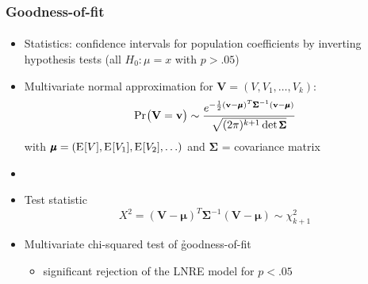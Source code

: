 \documentclass[handout,notes=show,t]{beamer} %
\begin{document}
\begin{frame}
  \frametitle{Goodness-of-fit}
  \framesubtitle{\citep[Sec.~3.3]{Baayen:01}}

  \begin{itemize}
  \item Statistics: confidence intervals for population coefficients by inverting hypothesis tests (all $H_0: \mu = x$ with $p > .05$)
  \item<2-> Multivariate normal approximation for $\mathbf{V} = (V, V_1, \ldots, V_k)$:
    \[
      \mathop{\mathrm{Pr}_{}}\bigl(\mathbf{V} = \mathbf{v}\bigr) \sim
      \frac{
        e^{-\frac12 (\mathbf{v} - \pmb{\mu})^T \pmb{\Sigma}^{-1} (\mathbf{v} - \pmb{\mu})}
      }{\small
        \sqrt{(2\pi)^{k+1} \det \pmb{\Sigma}}
      }
    \]
    with $\pmb{\mu} = (\mathrm{E}_{}[V], \mathrm{E}_{}[V_1], \mathrm{E}_{}[V_2], \ldots)$ and $\pmb{\Sigma}$ = covariance matrix
  \item[]
  \item<3-> Test statistic
    \[
      X^2 = (\mathbf{V} - \pmb{\mu})^T \pmb{\Sigma}^{-1} (\mathbf{V} - \pmb{\mu}) \sim \chi^2_{k + 1}
    \]
  \item<3->[\So] Multivariate chi-squared test of \h{goodness-of-fit}
    \begin{itemize}
    \item[\hand] significant rejection of the LNRE model for $p < .05$
    \end{itemize}
  \end{itemize}
\end{frame}
\end{document}
